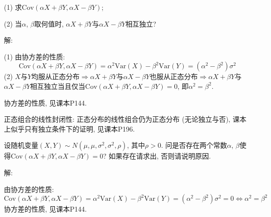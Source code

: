 \documentclass[standard]{ExBook}
\begin{document}
\begin{qitems}
\begin{bbox}
\begin{shaded}
(1) 求$\mathrm{Cov}(\alpha X+\beta Y,\alpha X-\beta Y)$;

(2) 当$\alpha$, $\beta$取何值时, $\alpha X+\beta Y$与$\alpha X-\beta Y$相互独立?
    \end{shaded}
    \end{bbox}

\vspace{-5em}

    \begin{bbox}
解: 

(1) 由协方差的性质:
$$\mathrm{Cov}(\alpha X+\beta Y,\alpha X-\beta Y)=\alpha^2 \mathrm{Var}(X)-\beta^2 \mathrm{Var}(Y)=\left(\alpha^2-\beta^2\right)\sigma^2$$
(2) $X$与$Y$均服从正态分布$\Longrightarrow$$\alpha X+\beta Y$与$\alpha X-\beta Y$也服从正态分布$\Longrightarrow$$\alpha X+\beta Y$与$\alpha X-\beta Y$相互独立当且仅当$\mathrm{Cov}(\alpha X+\beta Y,\alpha X-\beta Y)=0$, 即$\alpha^2=\beta^2$.
    \end{bbox}

\vspace{-5em}

    \begin{bbox}
\textcolor{themeColor}{\selectfont {} 协方差的性质, 见课本P144.}

\textcolor{themeColor}{\selectfont {} 正态组合的线性封闭性: 正态分布的线性组合仍为正态分布 (无论独立与否), 课本上似乎只有独立条件下的证明, 见课本P196.}
    \end{bbox}

\vspace{-5em}

    \begin{bbox}
    \begin{shaded}
        \qitem
设随机变量$(X,Y)\sim N(\mu,\mu,\sigma^2,\sigma^2,\rho)$, 其中$\rho>0$. 问是否存在两个常数$\alpha$, $\beta$使得$\mathrm{Cov}(\alpha X+\beta Y,\alpha X-\beta Y)=0$? 如果存在请求出, 否则请说明原因.
    \end{shaded}
    \end{bbox}

\vspace{-5em}

    \begin{bbox}
解: 

由协方差的性质:
$$\mathrm{Cov}(\alpha X+\beta Y,\alpha X-\beta Y)=\alpha^2 \mathrm{Var}(X)-\beta^2 \mathrm{Var}(Y)=\left(\alpha^2-\beta^2\right)\sigma^2=0 \Longleftrightarrow \alpha^2=\beta^2$$
\textcolor{themeColor}{\selectfont {} 协方差的性质, 见课本P144.}
    \end{bbox}


\end{qitems}
\end{document}
